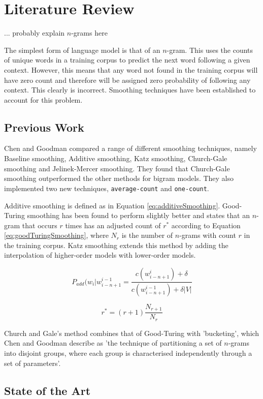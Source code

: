 \chapter{Literature Review}


... probably explain $n$-grams here

The simplest form of language model is that of an $n$-gram. This uses the counts of unique words in a training corpus to predict the next word following a given context. However, this means that any word not found in the training corpus will have zero count and therefore will be assigned zero probability of following any context. This clearly is incorrect. Smoothing techniques have been established to account for this problem.

\section{Previous Work}

Chen and Goodman \cite{chen1996empirical} compared a range of different smoothing techniques, namely Baseline smoothing, Additive smoothing, Katz smoothing, Church-Gale smoothing and Jelinek-Mercer smoothing. They found that Church-Gale smoothing outperformed the other methods for bigram models. They also implemented two new techniques, \lstinline!average-count! and \lstinline!one-count!. 

Additive smoothing is defined as in Equation \ref{eq:additiveSmoothing}. Good-Turing smoothing has been found to perform slightly better and states that an $n$-gram that occurs $r$ times has an adjusted count of $r^{*}$ according to Equation \ref{eq:goodTuringSmoothing}, where $N_{r}$ is the number of $n$-grams with count $r$ in the training corpus. Katz smoothing extends this method by adding the interpolation of higher-order models with lower-order models. 

\begin{equation}
\label{eq:additiveSmoothing}
P_{add}(w_{i}|w_{i-n+1}^{i-1}=\frac{c(w_{i-n+1}^{i})+\delta}{c(w_{i-n+1}^{i-1})+\delta|V|}
\end{equation}

\begin{equation}
\label{eq:goodTuringSmoothing}
r^{*}=(r+1)\frac{N_{r+1}}{N_{r}}
\end{equation}

Church and Gale's method combines that of Good-Turing with 'bucketing', which Chen and Goodman describe as 'the technique of partitioning a set of $n$-grams into disjoint groups, where each group is characterised independently through a set of parameters'.


\section{State of the Art}


